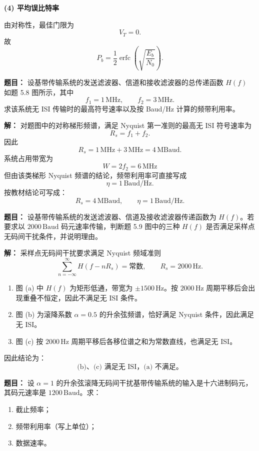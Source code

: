 \textbf{(4) 平均误比特率}\par
由对称性，最佳门限为
\[
V_T=0.
\]
故
\[
P_b=\frac12\operatorname{erfc}\!\left(\sqrt{\frac{E_b}{N_0}}\right).
\]

\medskip
{}
\textbf{题目：}
设基带传输系统的发送滤波器、信道和接收滤波器的总传递函数 $H(f)$ 如题 5.8 图所示，其中
\[
f_1=1\,\mathrm{MHz},\qquad f_2=3\,\mathrm{MHz}.
\]
求该系统无 ISI 传输时的最高符号速率以及按 Baud/Hz 计算的频带利用率。

\par\textbf{解：}
对题图中的对称梯形频谱，满足 Nyquist 第一准则的最高无 ISI 符号速率为
\[
R_s=f_1+f_2.
\]
因此
\[
R_s=1\,\mathrm{MHz}+3\,\mathrm{MHz}=4\,\mathrm{MBaud}.
\]
系统占用带宽为
\[
W=2f_2=6\,\mathrm{MHz}
\]
但由该类梯形 Nyquist 频谱的结论，频带利用率可直接写成
\[
\eta=1\,\mathrm{Baud/Hz}.
\]
按教材结论可写成：
\[
\boxed{R_s=4\,\mathrm{MBaud},\qquad \eta=1\,\mathrm{Baud/Hz}.}
\]

\medskip
{}
\textbf{题目：}
设基带传输系统的发送滤波器、信道及接收滤波器传递函数为 $H(f)$。若要求以 $2000\,\mathrm{Baud}$ 码元速率传输，判断题 5.9 图中的三种 $H(f)$ 是否满足采样点无码间干扰条件，并说明理由。

\par\textbf{解：}
采样点无码间干扰要求满足 Nyquist 频域准则
\[
\sum_{n=-\infty}^{\infty}H(f-nR_s)=\text{常数},
\qquad R_s=2000\,\mathrm{Hz}.
\]

\begin{enumerate}
\item 图 (a) 中 $H(f)$ 为矩形低通，带宽为 $\pm 1500\,\mathrm{Hz}$。按 $2000\,\mathrm{Hz}$ 周期平移后会出现重叠不恒定，因此不满足无 ISI 条件。
\item 图 (b) 为滚降系数 $\alpha=0.5$ 的升余弦频谱，恰好满足 Nyquist 条件，因此满足无 ISI。
\item 图 (c) 按 $2000\,\mathrm{Hz}$ 周期平移后各移位谱之和为常数直线，也满足无 ISI。
\end{enumerate}

因此结论为：
\[
\boxed{\text{(b)、(c) 满足无 ISI，(a) 不满足。}}
\]

\medskip
{}
\textbf{题目：}
设 $\alpha=1$ 的升余弦滚降无码间干扰基带传输系统的输入是十六进制码元，其码元速率是 $1200\,\mathrm{Baud}$。求：
\begin{enumerate}
\item 截止频率；
\item 频带利用率（写上单位）；
\item 数据速率。
\end{enumerate}


